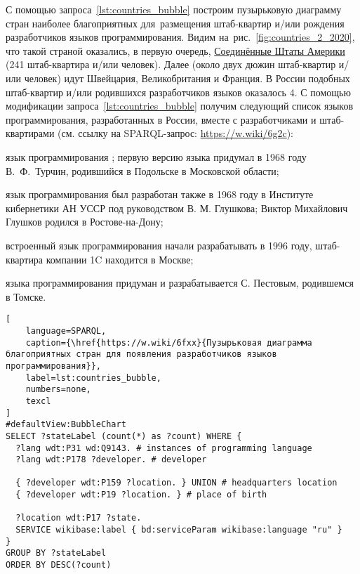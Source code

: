 С помощью запроса~\ref{lst:countries_bubble} 
построим пузырьковую диаграмму стран  
наиболее благоприятных для~размещения штаб-квартир и/или 
рождения разработчиков языков программирования. 
Видим на~рис.~\ref{fig:countries_2_2020}, 
что такой страной оказались, в первую очередь, 
\href{https://en.wikipedia.org/wiki/USA}{Соединённые Штаты Америки} (241 штаб-квартира и/или человек). 
Далее (около двух дюжин штаб-квартир и/или человек) идут 
Швейцария, Великобритания и Франция.  
В России подобных штаб-квартир и/или родившихся разработчиков языков оказалось 4. 
С помощью модификации запроса~\ref{lst:countries_bubble} получим 
следующий список языков программирования, разработанных в России, 
вместе с разработчиками и штаб-квартирами 
(см. ссылку на SPARQL-запрос: \href{https://w.wiki/6g2c}{https://w.wiki/6g2c}):
\begin{compactitemize}
	\item язык программирования ;  
        первую версию языка придумал в 1968 году В.~Ф.~Турчин, 
        родившийся в Подольске в Московской области; 

    \item язык программирования  
        был разработан также в 1968 году в Институте кибернетики АН УССР 
        под руководством В. М. Глушкова; Виктор Михайлович Глушков родился в Ростове-на-Дону;

	\item встроенный язык программирования  начали разрабатывать в 1996 году, 
        штаб-квартира компании 1C находится в Москве; 

    \item языка программирования 
        придуман и разрабатывается С. Пестовым, родившемся в Томске.
\end{compactitemize}



\begin{lstlisting}[
	language=SPARQL,
	caption={\href{https://w.wiki/6fxx}{Пузырьковая диаграмма благоприятных стран для появления разработчиков языков программирования}},
	label=lst:countries_bubble,
    numbers=none,
	texcl
]
#defaultView:BubbleChart
SELECT ?stateLabel (count(*) as ?count) WHERE {
  ?lang wdt:P31 wd:Q9143. # instances of programming language
  ?lang wdt:P178 ?developer. # developer
  	
  { ?developer wdt:P159 ?location. } UNION # headquarters location
  { ?developer wdt:P19 ?location. } # place of birth
  
  ?location wdt:P17 ?state.
  SERVICE wikibase:label { bd:serviceParam wikibase:language "ru" } 	
}
GROUP BY ?stateLabel
ORDER BY DESC(?count)
\end{lstlisting}







